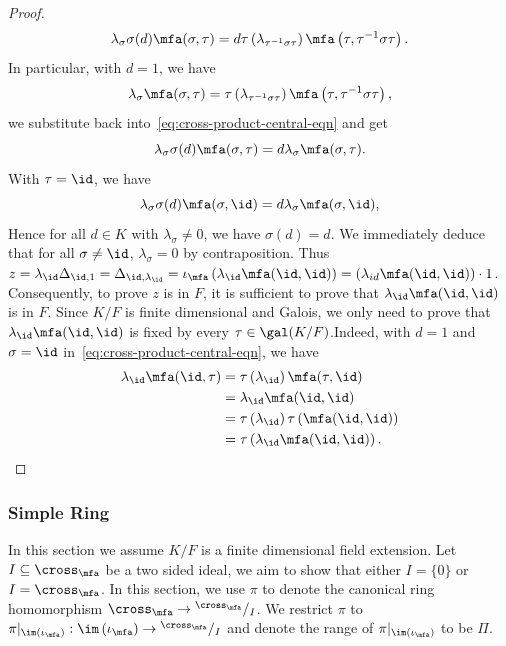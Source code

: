 \begin{proof}
\begin{equation}
    \lambda_{\sigma}\sigma(d)\mfa(\sigma,\tau) = d\tau\left(\lambda_{\tau^{-1}\sigma\tau}\right)\mfa\left(\tau,\tau^{-1}\sigma\tau\right).
  \end{equation}
  In particular, with $d = 1$, we have
  \[
    \lambda_{\sigma}\mfa(\sigma,\tau) = \tau\left(\lambda_{\tau^{-1}\sigma\tau}\right)\mfa\left(\tau,\tau^{-1}\sigma\tau\right),
  \]
  we substitute back into~\cref{eq:cross-product-central-eqn} and get
  \[
    \lambda_{\sigma}\sigma(d)\mfa(\sigma,\tau) = d\lambda_{\sigma}\mfa(\sigma,\tau).
  \]
  With $\tau = \id$, we have
  \[
    \lambda_{\sigma}\sigma(d)\mfa(\sigma,\id)=d\lambda_{\sigma}\mfa(\sigma,\id),
  \]
  Hence for all $d \in K$ with $\lambda_{\sigma} \ne 0$, we have $\sigma(d) = d$. We immediately deduce that for all $\sigma \ne \id$, $\lambda_{\sigma} = 0$ by contraposition. Thus $z = \lambda_{\id}\Delta_{\id, 1} = \Delta_{\id,\lambda_{\id}} = \iota_{\mfa}\left(\lambda_{\id}\mfa(\id,\id)\right) = \left(\lambda_{id}\mfa(\id,\id)\right) \cdot 1$. Consequently, to prove $z$ is in $F$, it is sufficient to prove that $\lambda_{\id}\mfa(\id,\id)$ is in $F$. Since $K/F$ is finite dimensional and Galois, we only need to prove that $\lambda_{\id}\mfa(\id,\id)$ is fixed by every $\tau\in\gal(K/F)$.Indeed, with $d = 1$ and $\sigma = \id$ in~\cref{eq:cross-product-central-eqn}, we have
  \[
    \begin{aligned}
      \lambda_{\id}\mfa(\id,\tau) &= \tau\left(\lambda_{\id}\right)\mfa(\tau,\id)\\
      &= \lambda_{\id}\mfa(\id,\id) \\ &= \tau\left(\lambda_{\id}\right)\tau\left(\mfa(\id,\id)\right)\\
      &= \tau\left(\lambda_{\id}\mfa(\id,\id)\right).
    \end{aligned}
  \]

\end{proof}


\subsubsection{Simple Ring}
In this section we assume $K/F$ is a finite dimensional field extension. Let $I \subseteq \cross_{\mfa}$ be a two sided ideal, we aim to show that either $I = \{0\}$ or $I = \cross_{\mfa}$. In this section, we use $\pi$ to denote the canonical ring homomorphism $\cross_{\mfa}\to{}^{\cross_{\mfa}}/_{I}$. We restrict $\pi$ to $\pi|_{\im\left(\iota_{\mfa}\right)} : \im\left(\iota_{\mfa}\right) \to {}^{\cross_{\mfa}}/_{I}$ and denote the range of $\pi|_{\im\left(\iota_{\mfa}\right)}$ to be $\Pi$.

